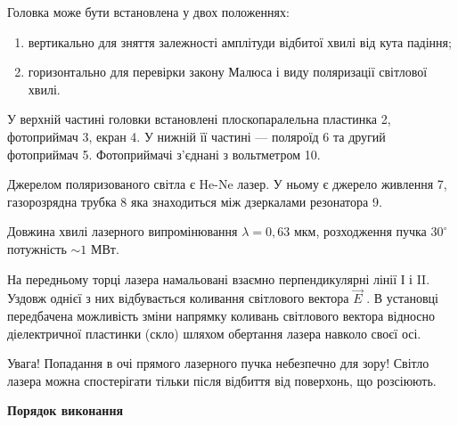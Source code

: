 \documentclass[12pt,a4paper]{article}
\begin{document}
    Головка може бути встановлена у двох положеннях:

    \begin{enumerate}[label=\alph*)]
        \item вертикально для зняття залежності амплітуди відбитої хвилі від кута падіння;
        \item горизонтально для перевірки закону Малюса і виду поляризації світлової хвилі.
    \end{enumerate}

    У верхній частині головки встановлені
    плоскопаралельна пластинка 2, фотоприймач 3,
    екран 4. У нижній її частині --- поляроїд 6 та
    другий фотоприймач 5. Фотоприймачі з'єднані з
    вольтметром 10.

    Джерелом поляризованого світла є He-Ne
    лазер. У ньому є джерело живлення 7, газорозрядна трубка 8 яка знаходиться між
    дзеркалами резонатора 9.

    Довжина хвилі лазерного випромінювання $\lambda = 0{,}63$ мкм,
    розходження пучка $30^{\circ}$ потужність $\sim 1$ МВт.

    На передньому торці лазера намальовані взаємно перпендикулярні лінії І і II.
    Уздовж однієї з них відбувається коливання світлового вектора $\vec{E}$ . В установці
    передбачена можливість зміни напрямку коливань світлового вектора відносно
    діелектричної пластинки (скло) шляхом обертання лазера навколо своєї осі.

    Увага! Попадання в очі прямого лазерного пучка небезпечно для зору! Світло лазера
    можна спостерігати тільки після відбиття від поверхонь, що розсіюють.

    \newpage

    \begin{center} \textbf{Порядок виконання} \end{center}

    \newpage
\end{document}
